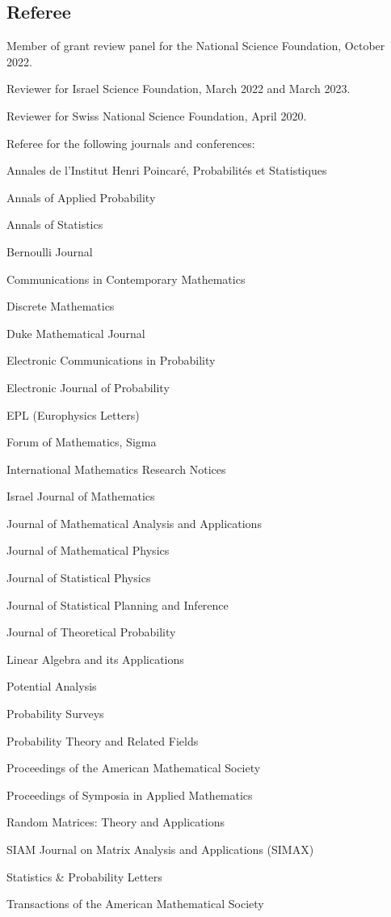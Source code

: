 \documentclass[letterpaper]{article}
\renewenvironment{itemize}{
  \begin{list}{}{
    \setlength{\leftmargin}{1em}
  }
}{
  \end{list}
}
\begin{document}
\subsection*{Referee} 
\begin{itemize}
	\item Member of grant review panel for the National Science Foundation, October 2022. 
	\item Reviewer for Israel Science Foundation, March 2022 and March 2023.  
	\item Reviewer for Swiss National Science Foundation, April 2020.  
	\item Referee for the following journals and conferences: 
	\begin{itemize}
		\item Annales de l'Institut Henri Poincar\'{e}, Probabilit\'{e}s et Statistiques
		\item Annals of Applied Probability
		\item Annals of Statistics
		\item Bernoulli Journal
		\item Communications in Contemporary Mathematics
		\item Discrete Mathematics
		\item Duke Mathematical Journal
		\item Electronic Communications in Probability
		\item Electronic Journal of Probability
		\item EPL (Europhysics Letters)
		\item Forum of Mathematics, Sigma
		\item International Mathematics Research Notices
		\item Israel Journal of Mathematics 
		\item Journal of Mathematical Analysis and Applications
		\item Journal of Mathematical Physics
		\item Journal of Statistical Physics
		\item Journal of Statistical Planning and Inference
		\item Journal of Theoretical Probability
		\item Linear Algebra and its Applications
		\item Potential Analysis
		\item Probability Surveys
		\item Probability Theory and Related Fields
		\item Proceedings of the American Mathematical Society
		\item Proceedings of Symposia in Applied Mathematics
		\item Random Matrices: Theory and Applications
		\item SIAM Journal on Matrix Analysis and Applications (SIMAX)
		\item Statistics \& Probability Letters
		\item Transactions of the American Mathematical Society
	\end{itemize}
\end{itemize}
\end{document}
